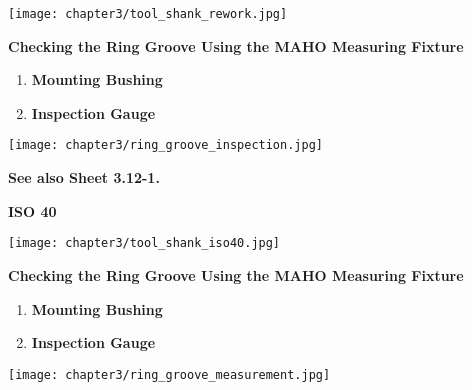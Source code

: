 \begin{minipage}{\textwidth}
    \centering
    \texttt{[image: chapter3/tool\_shank\_rework.jpg]}
\end{minipage}

\vspace{0.5cm}

\textbf{Checking the Ring Groove Using the MAHO Measuring Fixture}

\begin{enumerate}[itemsep=1pt,parsep=0pt]
    \item \textbf{Mounting Bushing}
    \item \textbf{Inspection Gauge}
\end{enumerate}

\vspace{0.5cm}

\begin{minipage}{\textwidth}
    \centering
    \texttt{[image: chapter3/ring\_groove\_inspection.jpg]}
\end{minipage}

\vspace{0.5cm}

\noindent \textbf{See also Sheet 3.12-1.}


\setcounter{page}{3}

\textbf{ISO 40}

\vspace{0.5cm}

\begin{minipage}{\textwidth}
    \centering
    \texttt{[image: chapter3/tool\_shank\_iso40.jpg]}
\end{minipage}

\vspace{0.5cm}

\textbf{Checking the Ring Groove Using the MAHO Measuring Fixture}

\begin{enumerate}[itemsep=1pt,parsep=0pt]
    \item \textbf{Mounting Bushing}
    \item \textbf{Inspection Gauge}
\end{enumerate}

\vspace{0.5cm}

\begin{minipage}{\textwidth}
    \centering
    \texttt{[image: chapter3/ring\_groove\_measurement.jpg]}
\end{minipage}

